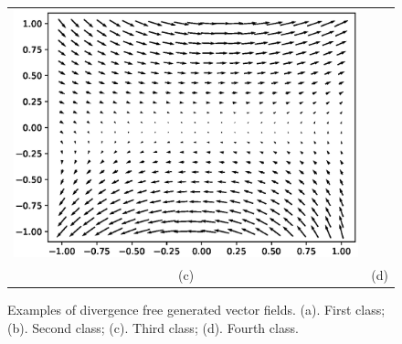 \begin{figure}[ht]
\begin{center}
\begin{tabular}{cc}
				\includegraphics[scale=.40]{second_div_field.eps} \\
				(c) & (d)
			\end{tabular}
		\end{center}
		\caption{Examples of divergence free generated vector fields.
			(a). First class; 
			(b). Second class;
			(c). Third class;
			(d). Fourth class.
			}
		\label{fig:data_ex}
\end{figure}
